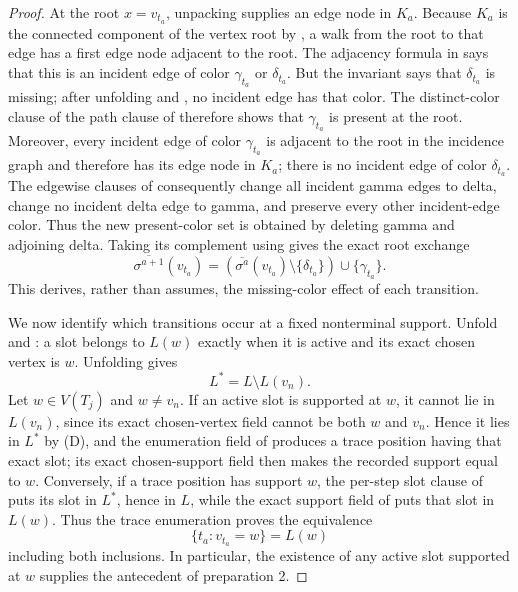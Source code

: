 \begin{proof}
At the root \(x=v_{t_a}\), unpacking
 supplies an edge node in \(K_a\).
Because \(K_a\) is the connected component of the vertex root by
, a walk from the root to that edge has a
first edge node adjacent to the root.  The adjacency formula in
 says that this is an incident edge of
color \(\gamma_{t_a}\) or \(\delta_{t_a}\).  But the invariant says
that \(\delta_{t_a}\) is missing; after unfolding
 and , no incident edge
has that color.  The distinct-color clause of
the path clause of  therefore shows that
\(\gamma_{t_a}\) is present at the root.
Moreover, every incident edge of color \(\gamma_{t_a}\) is adjacent to
the root in the incidence graph and therefore has its edge node in
\(K_a\); there is no incident edge of color \(\delta_{t_a}\).
The edgewise clauses of  consequently
change all incident gamma edges to delta, change no incident delta edge
to gamma, and preserve every other incident-edge color.  Thus the new
present-color set is obtained by deleting gamma and adjoining delta.
Taking its complement using  gives the exact root
exchange
\[
 \overline{\sigma^{a+1}}(v_{t_a})
   =(\overline{\sigma^a}(v_{t_a})
        \setminus\{\delta_{t_a}\})
          \cup\{\gamma_{t_a}\}.                              \tag{6}
\]
This derives, rather than assumes, the missing-color effect of each
transition.

We now identify which transitions occur at a fixed nonterminal support.
Unfold  and
: a slot belongs to \(L(w)\) exactly
when it is active and its exact chosen vertex is \(w\).  Unfolding
 gives
\[
                         L^*=L\setminus L(v_n).                \tag{D}
\]
Let \(w\in V(T_j)\) and \(w\ne v_n\).  If an active slot is supported
at \(w\), it cannot lie in \(L(v_n)\), since its exact chosen-vertex
field cannot be both \(w\) and \(v_n\).  Hence it lies in \(L^*\) by
(D), and the enumeration field of
 produces a trace position having
that exact slot; its exact chosen-support field then makes the recorded
support equal to \(w\).  Conversely, if a trace position has support
\(w\), the per-step slot clause of
 puts its slot in \(L^*\),
hence in \(L\), while the exact support field of
 puts that slot in \(L(w)\).
Thus the trace enumeration proves the equivalence
\[
 \{t_a:v_{t_a}=w\}=L(w)                                      \tag{E}
\]
including both inclusions.  In particular, the existence of any active
slot supported at \(w\) supplies the antecedent of preparation 2.


\end{proof}
